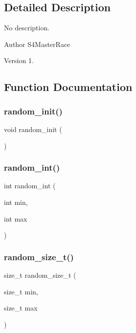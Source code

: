 \subsection{Detailed Description}
No description. 

\begin{DoxyAuthor}{Author}
S4\+Master\+Race 
\end{DoxyAuthor}
\begin{DoxyVersion}{Version}
1. 
\end{DoxyVersion}


\subsection{Function Documentation}
\mbox{\label{random_8h_af2e80b8de6ec1840dac4668ca5a38606}} 
\subsubsection{random\+\_\+init()}
{\footnotesize\ttfamily void random\+\_\+init (\begin{DoxyParamCaption}{ }\end{DoxyParamCaption})\hspace{0.3cm}{\ttfamily [inline]}}

\mbox{\label{random_8h_ad7954e6a1b9ea073c7bc894dc5af85a9}} 
\subsubsection{random\+\_\+int()}
{\footnotesize\ttfamily int random\+\_\+int (\begin{DoxyParamCaption}\item[{int}]{min,  }\item[{int}]{max }\end{DoxyParamCaption})\hspace{0.3cm}{\ttfamily [inline]}}

\mbox{\label{random_8h_a9911fe7c3f3108164ffac97c8d815142}} 
\subsubsection{random\+\_\+size\+\_\+t()}
{\footnotesize\ttfamily size\+\_\+t random\+\_\+size\+\_\+t (\begin{DoxyParamCaption}\item[{size\+\_\+t}]{min,  }\item[{size\+\_\+t}]{max }\end{DoxyParamCaption})\hspace{0.3cm}{\ttfamily [inline]}}

